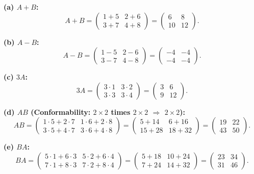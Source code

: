 \documentclass[12pt,a4paper]{article}
\begin{document}
\textbf{(a) $A + B$:}
\[
A + B = \begin{pmatrix} 1+5 & 2+6 \\ 3+7 & 4+8 \end{pmatrix} = \begin{pmatrix} 6 & 8 \\ 10 & 12 \end{pmatrix}.
\]

\textbf{(b) $A - B$:}
\[
A - B = \begin{pmatrix} 1-5 & 2-6 \\ 3-7 & 4-8 \end{pmatrix} = \begin{pmatrix} -4 & -4 \\ -4 & -4 \end{pmatrix}.
\]

\textbf{(c) $3A$:}
\[
3A = \begin{pmatrix} 3\cdot1 & 3\cdot2 \\ 3\cdot3 & 3\cdot4 \end{pmatrix} = \begin{pmatrix} 3 & 6 \\ 9 & 12 \end{pmatrix}.
\]

\textbf{(d) $AB$ (Conformability: $2\times2$ times $2\times2$ $\Rightarrow$ $2\times2$):}
\[
AB = \begin{pmatrix} 1\cdot5+2\cdot7 & 1\cdot6+2\cdot8 \\ 3\cdot5+4\cdot7 & 3\cdot6+4\cdot8 \end{pmatrix} = \begin{pmatrix} 5+14 & 6+16 \\ 15+28 & 18+32 \end{pmatrix} = \begin{pmatrix} 19 & 22 \\ 43 & 50 \end{pmatrix}.
\]

\textbf{(e) $BA$:}
\[
BA = \begin{pmatrix} 5\cdot1+6\cdot3 & 5\cdot2+6\cdot4 \\ 7\cdot1+8\cdot3 & 7\cdot2+8\cdot4 \end{pmatrix} = \begin{pmatrix} 5+18 & 10+24 \\ 7+24 & 14+32 \end{pmatrix} = \begin{pmatrix} 23 & 34 \\ 31 & 46 \end{pmatrix}.
\]
\end{document}
